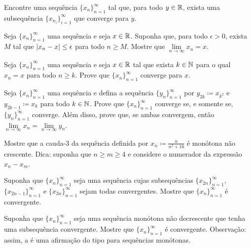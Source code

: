\begin{exercise}[Desafio]
Encontre uma sequência $\{ x_n \}_{n=1}^\infty$ tal que, para todo
$y \in {\mathbb{R}}$, exista uma subsequência $\{ x_{n_i} \}_{i=1}^\infty$ que
converge para $y$.
\end{exercise}

\begin{exercise}[F\'acil]
Seja $\{ x_n \}_{n=1}^\infty$ uma sequência e seja $x \in {\mathbb{R}}$.
Suponha que, para todo $\epsilon > 0$, exista $M$ tal que
$\lvert {x_n-x} \rvert \leq \epsilon$ para todo $n \geq M$.
Mostre que $\lim\limits_{n\to\infty} x_n = x$.
\end{exercise}

\begin{exercise}[F\'acil]
Seja $\{ x_n \}_{n=1}^\infty$ uma sequência e seja $x \in {\mathbb{R}}$ tal que
exista $k \in {\mathbb{N}}$ para o qual $x_n = x$ para todo $n \geq k$.
Prove que $\{ x_n \}_{n=1}^\infty$ converge para $x$.
\end{exercise}

\begin{exercise}
Seja $\{ x_n \}_{n=1}^\infty$ uma sequência e defina a sequência
$\{ y_n \}_{n=1}^\infty$ por
$y_{2k} \coloneqq x_{k^2}$ e $y_{2k-1} \coloneqq x_k$ para todo $k \in {\mathbb{N}}$.
Prove que $\{ x_n \}_{n=1}^\infty$ converge se, e somente se,
$\{ y_n \}_{n=1}^\infty$ converge.
Além disso, prove que, se ambas convergem, então
$\lim\limits_{n\to\infty} x_n = \lim\limits_{n\to\infty} y_n$.
\end{exercise}

\begin{exercise}
Mostre que a cauda-$3$ da sequência definida por
$x_n \coloneqq \frac{n}{n^2+16}$ é monótona não crescente.
Dica: suponha que $n \geq m \geq 4$ e considere o numerador da expressão
$x_n-x_m$.
\end{exercise}

\begin{exercise}
Suponha que $\{ x_n \}_{n=1}^\infty$ seja uma sequência cujas
subsequências $\{ x_{2n} \}_{n=1}^\infty$, $\{ x_{2n-1} \}_{n=1}^\infty$ e
$\{ x_{3n} \}_{n=1}^\infty$ sejam todas convergentes. Mostre que
$\{ x_n \}_{n=1}^\infty$ é convergente.
\end{exercise}

\begin{exercise}
Suponha que $\{ x_n \}_{n=1}^\infty$ seja uma sequência monótona não
decrescente que tenha uma subsequência convergente.
Mostre que $\{ x_n \}_{n=1}^\infty$ é convergente.
Observação: assim, a  é uma afirmação do tipo
 para sequências monótonas.
\end{exercise}

